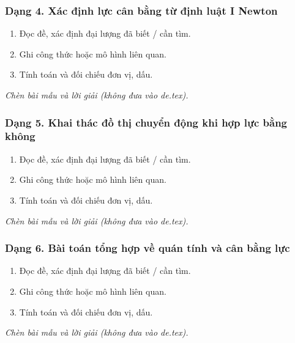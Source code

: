 \subsubsection{Dạng 4. Xác định lực cân bằng từ định luật I Newton}
\begin{phuongphap}
\begin{enumerate}
\item Đọc đề, xác định đại lượng đã biết / cần tìm.
\item Ghi công thức hoặc mô hình liên quan.
\item Tính toán và đối chiếu đơn vị, dấu.
\end{enumerate}
\end{phuongphap}
\begin{vidumau}
\textit{Chèn bài mẫu và lời giải (không đưa vào de.tex).}
\end{vidumau}

\subsubsection{Dạng 5. Khai thác đồ thị chuyển động khi hợp lực bằng không}
\begin{phuongphap}
\begin{enumerate}
\item Đọc đề, xác định đại lượng đã biết / cần tìm.
\item Ghi công thức hoặc mô hình liên quan.
\item Tính toán và đối chiếu đơn vị, dấu.
\end{enumerate}
\end{phuongphap}
\begin{vidumau}
\textit{Chèn bài mẫu và lời giải (không đưa vào de.tex).}
\end{vidumau}

\subsubsection{Dạng 6. Bài toán tổng hợp về quán tính và cân bằng lực}
\begin{phuongphap}
\begin{enumerate}
\item Đọc đề, xác định đại lượng đã biết / cần tìm.
\item Ghi công thức hoặc mô hình liên quan.
\item Tính toán và đối chiếu đơn vị, dấu.
\end{enumerate}
\end{phuongphap}
\begin{vidumau}
\textit{Chèn bài mẫu và lời giải (không đưa vào de.tex).}
\end{vidumau}

